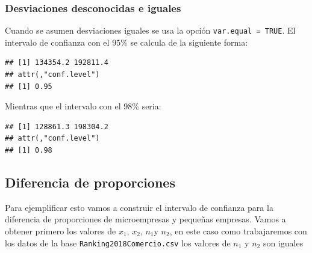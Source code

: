 \documentclass[letterpaper,]{book}
\newenvironment{Shaded}{\begin{snugshade}}{\end{snugshade}}
\newcommand{\DataTypeTok}[1]{\textcolor[rgb]{0.13,0.29,0.53}{#1}}
\newcommand{\FloatTok}[1]{\textcolor[rgb]{0.00,0.00,0.81}{#1}}
\newcommand{\KeywordTok}[1]{\textcolor[rgb]{0.13,0.29,0.53}{\textbf{#1}}}
\newcommand{\NormalTok}[1]{#1}
\newcommand{\OperatorTok}[1]{\textcolor[rgb]{0.81,0.36,0.00}{\textbf{#1}}}
\newcommand{\OtherTok}[1]{\textcolor[rgb]{0.56,0.35,0.01}{#1}}
\begin{document}
\hypertarget{desviaciones-desconocidas-e-iguales-1}{%
\subsubsection{Desviaciones desconocidas e iguales}\label{desviaciones-desconocidas-e-iguales-1}}

Cuando se asumen desviaciones iguales se usa la opción \texttt{var.equal\ =\ TRUE}. El intervalo de confianza con el \(95\)\% se calcula de la siguiente forma:

\begin{Shaded}
\end{Shaded}

\begin{verbatim}
## [1] 134354.2 192811.4
## attr(,"conf.level")
## [1] 0.95
\end{verbatim}

Mientras que el intervalo con el \(98\)\% seria:

\begin{Shaded}
\end{Shaded}

\begin{verbatim}
## [1] 128861.3 198304.2
## attr(,"conf.level")
## [1] 0.98
\end{verbatim}

\hypertarget{diferencia-de-proporciones}{%
\subsection{Diferencia de proporciones}\label{diferencia-de-proporciones}}

Para ejemplificar esto vamos a construir el intervalo de confianza para la diferencia de proporciones de microempresas y pequeñas empresas. Vamos a obtener primero los valores de \(x_1\), \(x_2\), \(n_1\)y \(n_2\), en este caso como trabajaremos con los datos de la base \texttt{Ranking2018Comercio.csv} los valores de \(n_1\) y \(n_2\) son iguales
\end{document}
